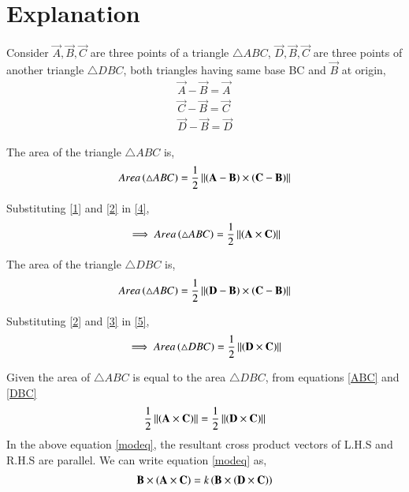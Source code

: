 \documentclass[journal,12pt,twocolumn]{IEEEtran}
\begin{document}
\section{Explanation}
\item Consider $\vec{A},\vec{B},\vec{C}$ are three points of a triangle $\triangle ABC$, $\vec{D}, \vec{B}, \vec{C}$ are three points of another triangle $\triangle DBC$, both triangles having same base BC and $\vec{B}$ at origin, 
\begin{align}
    \label{1}
    \vec{A}-\vec{B}=\vec{A}\\
    \label{2}
    \vec{C}-\vec{B}=\vec{C}\\
    \label{3}
    \vec{D}-\vec{B}=\vec{D}
\end{align}
\item The area of the triangle $\triangle ABC$ is,
\begin{align}
    \label{4}
    Area\left(\triangle ABC\right) = \frac{1}{2}\left\lVert\left(\mathbf{A} - \mathbf{B}\right) \times \left(\mathbf{C} - \mathbf{B}\right)\right\rVert
\end{align}
\item Substituting \eqref{1} and \eqref{2} in \eqref{4}, 
\begin{align}
    \label{ABC}
    \implies Area\left(\triangle ABC\right) = \frac{1}{2}\left\lVert\left(\mathbf{A} \times \mathbf{C}\right)\right\rVert
\end{align}
\item The area of the triangle $\triangle DBC$ is,
\begin{align}
    \label{5}
    Area\left(\triangle ABC\right) = \frac{1}{2}\left\lVert\left(\mathbf{D} - \mathbf{B}\right) \times \left(\mathbf{C} - \mathbf{B}\right)\right\rVert
\end{align}   
\item Substituting \eqref{2} and \eqref{3} in \eqref{5}, 
\begin{align}
    \label{DBC}
    \implies Area\left(\triangle DBC\right) = \frac{1}{2}\left\lVert\left(\mathbf{D} \times \mathbf{C}\right)\right\rVert
\end{align}
\item Given the area of $\triangle ABC$ is equal to the area $\triangle DBC$, from equations \eqref{ABC} and \eqref{DBC}
\begin{align}
    \label{modeq}
    \frac{1}{2}\left\lVert\left(\mathbf{A} \times \mathbf{C}\right)\right\rVert = \frac{1}{2}\left\lVert\left(\mathbf{D} \times \mathbf{C}\right)\right\rVert
\end{align}
In the above equation \eqref{modeq}, the resultant cross product vectors of L.H.S and R.H.S are parallel. We can write equation \eqref{modeq} as,
\begin{align}
    \mathbf{B} \times \left(\mathbf{A} \times \mathbf{C}\right) = k \left(\mathbf{B} \times \left(\mathbf{D}\times \mathbf{C}\right)\right)
\end{align}
\end{document}
